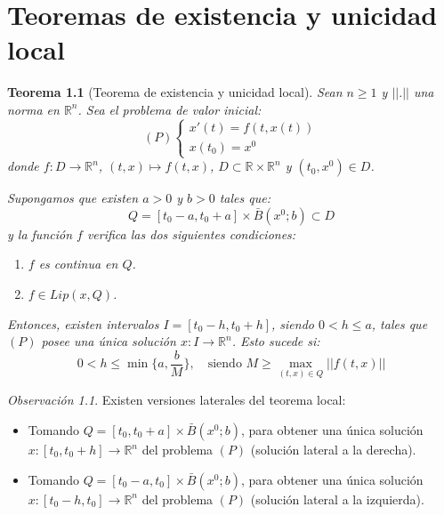 \documentclass{report}
\newtheorem{theorem}{Teorema}[chapter]
\theoremstyle{remark}
\newtheorem*{remark}{Observación}
\theoremstyle{remark}
\theoremstyle{remark}
\theoremstyle{definition}
\theoremstyle{definition}
\theoremstyle{definition}
\begin{document}
\chapter{Teoremas de existencia y unicidad local}
\begin{theorem}[Teorema de existencia y unicidad local]
    Sean $n \geq 1$ y $||.||$ una norma en $\mathbb{R}^n$.
    Sea el problema de valor inicial:
    $$(P) \begin{cases}
            x'(t) = f(t, x(t)) \\
            x(t_0) = x^0
        \end{cases}$$
    donde $f: D \to \mathbb{R}^n$, $(t, x) \mapsto f(t, x)$, $D \subset \mathbb{R} \times \mathbb{R}^n$ y $(t_0, x^0) \in D$.

    Supongamos que existen $a > 0$ y $b > 0$ tales que:
    $$Q = [t_0 - a, t_0 + a] \times \bar{B}(x^0; b) \subset D$$
    y la función $f$ verifica las dos siguientes condiciones:
    \begin{enumerate}
        \item $f$ es continua en $Q$.
        \item $f \in Lip(x, Q)$.
    \end{enumerate}
    Entonces, existen intervalos $I = [t_0 - h, t_0 + h]$, siendo $0 < h \leq a$, tales que $(P)$ posee una única solución $x: I \to \mathbb{R}^n$.
    Esto sucede si:
    $$0 < h \leq \min\{a, \frac{b}{M}\}, \quad \text{siendo } M \geq \max_{(t, x) \in Q} ||f(t, x)||$$
\end{theorem}

\begin{remark}
    Existen versiones laterales del teorema local:
    \begin{itemize}
        \item Tomando $Q = [t_0, t_0 + a] \times \bar{B}(x^0; b)$, para obtener una única solución $x: [t_0, t_0 + h] \to \mathbb{R}^n$ del problema $(P)$ (solución lateral a la derecha).
        \item Tomando $Q = [t_0 - a, t_0] \times \bar{B}(x^0; b)$, para obtener una única solución $x: [t_0 - h, t_0] \to \mathbb{R}^n$ del problema $(P)$ (solución lateral a la izquierda).
    \end{itemize}
\end{remark}
\end{document}
